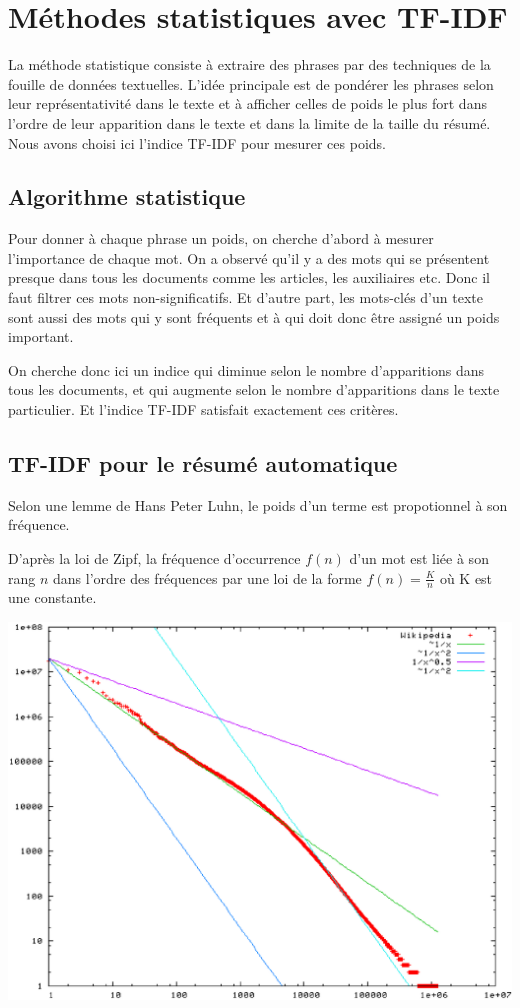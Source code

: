 \documentclass[a4paper, 12pt]{article}
\begin{document}
\section{Méthodes statistiques avec TF-IDF}

La méthode statistique consiste à extraire des phrases par des techniques de la fouille de données textuelles. L'idée principale est de pondérer les phrases selon leur représentativité dans le texte et à afficher celles de poids le plus fort dans l'ordre de leur apparition dans le texte et dans la limite de la taille du résumé. Nous avons choisi ici l'indice TF-IDF pour mesurer ces poids.

\subsection{Algorithme statistique}

Pour donner à chaque phrase un poids, on cherche d'abord à mesurer l'importance de chaque mot. On a observé qu'il y a des mots qui se présentent presque dans tous les documents comme les articles, les auxiliaires etc. Donc il faut filtrer ces mots non-significatifs. Et d'autre part, les mots-clés d'un texte sont aussi des mots qui y sont fréquents et à qui doit donc être assigné un poids important.

On cherche donc ici un indice qui diminue selon le nombre d'apparitions dans tous les documents, et qui augmente selon le nombre d'apparitions dans le texte particulier. Et l'indice TF-IDF satisfait exactement ces critères.


\subsection{TF-IDF pour le résumé automatique}
Selon une lemme de Hans Peter Luhn, le poids d'un terme est propotionnel à son fréquence.

D'après la loi de Zipf, la fréquence d'occurrence $f(n)$ d'un mot est liée à son rang $n$ dans l'ordre des fréquences par une loi de la forme $f(n) = \frac{K}{n} $ où K est une constante.

\includegraphics[scale=0.5]{loi_de_zipf.eps}
\end{document}
